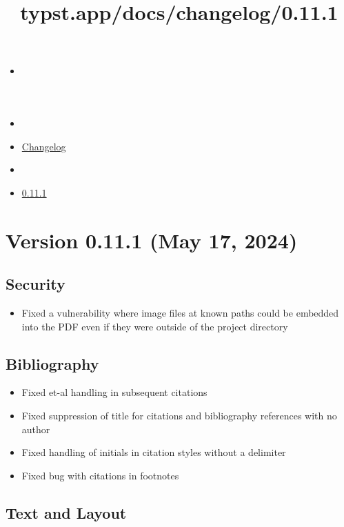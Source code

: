 \title{typst.app/docs/changelog/0.11.1}

\begin{itemize}
\tightlist
\item
  \href{/docs}{}
\item
  
\item
  \href{/docs/changelog/}{Changelog}
\item
  
\item
  \href{/docs/changelog/0.11.1/}{0.11.1}
\end{itemize}

\section{Version 0.11.1 (May 17,
2024)}\label{version-0.11.1-may-17-2024}

\subsection{Security}\label{security}

\begin{itemize}
\tightlist
\item
  Fixed a vulnerability where image files at known paths could be
  embedded into the PDF even if they were outside of the project
  directory
\end{itemize}

\subsection{Bibliography}\label{bibliography}

\begin{itemize}
\tightlist
\item
  Fixed et-al handling in subsequent citations
\item
  Fixed suppression of title for citations and bibliography references
  with no author
\item
  Fixed handling of initials in citation styles without a delimiter
\item
  Fixed bug with citations in footnotes
\end{itemize}

\subsection{Text and Layout}\label{text-and-layout}

